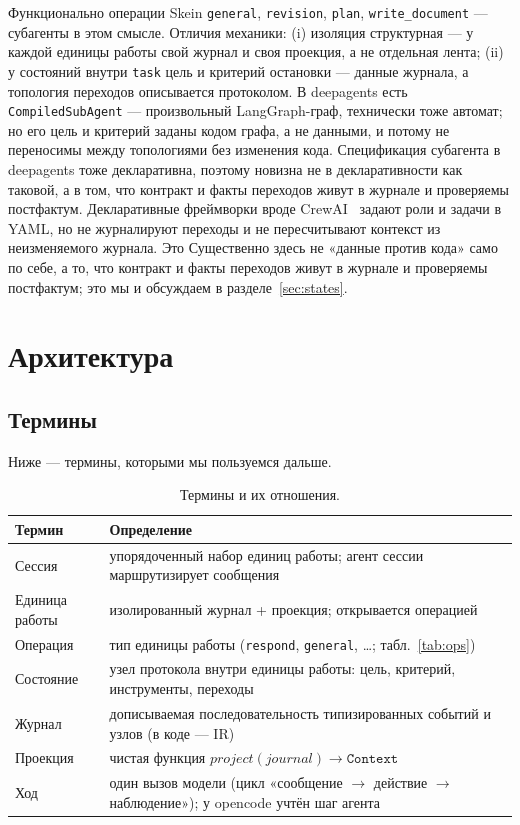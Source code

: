 \documentclass[11pt,a4paper]{article}
\begin{document}
Функционально операции Skein \texttt{general}, \texttt{revision}, \texttt{plan},
\texttt{write\_document} --- субагенты в этом смысле. Отличия механики: (i) изоляция
структурная --- у каждой единицы работы свой журнал и своя проекция, а не отдельная
лента; (ii) у состояний внутри \texttt{task} цель и критерий остановки --- данные журнала,
а топология переходов описывается протоколом. В deepagents есть \texttt{CompiledSubAgent}
--- произвольный LangGraph-граф, технически тоже автомат; но его цель и критерий заданы
кодом графа, а не данными, и потому не переносимы между топологиями без изменения кода.
Спецификация субагента в deepagents тоже декларативна, поэтому новизна не в декларативности
как таковой, а в том, что контракт и факты переходов живут в журнале и проверяемы
постфактум. Декларативные фреймворки вроде CrewAI~\cite{crewai} задают роли и задачи в YAML,
но не журналируют переходы и не пересчитывают контекст из неизменяемого журнала. Это
Существенно здесь не «данные против кода» само по себе, а то, что контракт и факты
переходов живут в журнале и проверяемы постфактум; это мы и обсуждаем в разделе~\ref{sec:states}.

\section{Архитектура}
\label{sec:arch}

\subsection{Термины}

Ниже --- термины, которыми мы пользуемся дальше.

\begin{table}[h]
\centering
\small
\caption{Термины и их отношения.}
\label{tab:terms}
\begin{tabularx}{\textwidth}{@{}lX@{}}
\toprule
Термин & Определение \\
\midrule
Сессия & упорядоченный набор единиц работы; агент сессии маршрутизирует сообщения \\
Единица работы & изолированный журнал + проекция; открывается операцией \\
Операция & тип единицы работы (\texttt{respond}, \texttt{general}, \ldots; табл.~\ref{tab:ops}) \\
Состояние & узел протокола внутри единицы работы: цель, критерий, инструменты, переходы \\
Журнал & дописываемая последовательность типизированных событий и узлов (в коде --- IR) \\
Проекция & чистая функция $project(journal) \rightarrow \texttt{Context}$ \\
Ход & один вызов модели (цикл «сообщение $\rightarrow$ действие $\rightarrow$ наблюдение»);
у opencode учтён шаг агента \\
\bottomrule
\end{tabularx}
\end{table}
\end{document}
